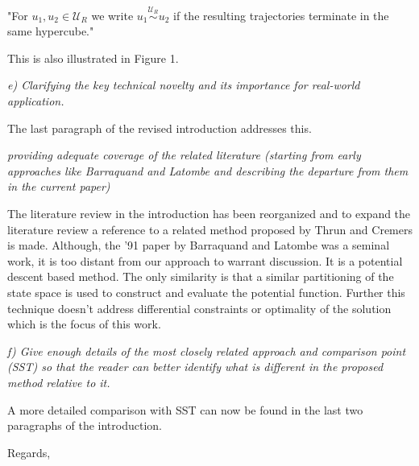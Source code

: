 \documentclass{letter}
\begin{document}
\begin{letter}{}
		"For $u_1,u_2 \in \mathcal{U}_R$ we write $u_{1}\overset{\mathcal{U}_R}{\sim}u_{2}$ if the resulting trajectories terminate in the same hypercube."
		
		This is also illustrated in Figure 1.
		
		\emph{e) Clarifying the key technical novelty and its importance for real-world application.}
		
		The last paragraph of the revised introduction addresses this.
		
		\emph{providing adequate coverage of the related literature (starting from early approaches like Barraquand and Latombe and describing the departure from them in the current paper)}
		 
		The literature review in the introduction has been reorganized and to expand the literature review a reference to a related method proposed by Thrun and Cremers is made. Although, the '91 paper by Barraquand and Latombe was a seminal work, it is too distant from our approach to warrant discussion. It is a potential descent based method. The only similarity is that a similar partitioning of the state space is used to construct and evaluate the potential function. Further this technique doesn't address differential constraints or optimality of the solution which is the focus of this work.   
		
		\emph{f) Give enough details of the most closely related approach and comparison point (SST) so that the reader can better identify what is different in the proposed method relative to it.}
		
		A more detailed comparison with SST can now be found in the last two paragraphs of the introduction.
		 
		\closing{Regards,}
		\vspace{-1in}
	\end{letter}
\end{document}
